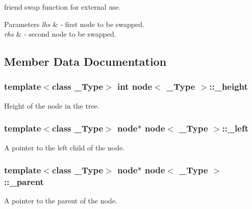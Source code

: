 friend swap function for external use. 


\begin{DoxyParams}{Parameters}
{\em lhs} & -\/ first node to be swapped. \\
\hline
{\em rhs} & -\/ second node to be swapped. \\
\hline
\end{DoxyParams}


\subsection{Member Data Documentation}
\hypertarget{structnode_a3acd2c366e647bce759f961f71ebf5b3}{}
\subsubsection[{\+\_\+height}]{\setlength{\rightskip}{0pt plus 5cm}template$<$class \+\_\+\+Type$>$ int {\bf node}$<$ \+\_\+\+Type $>$\+::\+\_\+height}\label{structnode_a3acd2c366e647bce759f961f71ebf5b3}


Height of the node in the tree. 

\hypertarget{structnode_af082014da104d7b72a3b7299d027ffbb}{}
\subsubsection[{\+\_\+left}]{\setlength{\rightskip}{0pt plus 5cm}template$<$class \+\_\+\+Type$>$ {\bf node}$\ast$ {\bf node}$<$ \+\_\+\+Type $>$\+::\+\_\+left}\label{structnode_af082014da104d7b72a3b7299d027ffbb}


A pointer to the left child of the node. 

\hypertarget{structnode_ad045681eca718a3867a16a9644aac2a6}{}
\subsubsection[{\+\_\+parent}]{\setlength{\rightskip}{0pt plus 5cm}template$<$class \+\_\+\+Type$>$ {\bf node}$\ast$ {\bf node}$<$ \+\_\+\+Type $>$\+::\+\_\+parent}\label{structnode_ad045681eca718a3867a16a9644aac2a6}


A pointer to the parent of the node. 

\hypertarget{structnode_aa65c4746c7391fb99f06fec3400addce}{}
